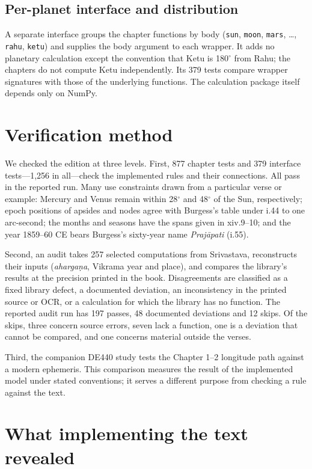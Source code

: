 \documentclass[11pt,a4paper]{article}
\begin{document}
\subsection{Per-planet interface and distribution}

A separate interface groups the chapter functions by body (\texttt{sun}, \texttt{moon}, \texttt{mars}, \ldots{}, \texttt{rahu}, \texttt{ketu}) and supplies the body argument to each wrapper. It adds no planetary calculation except the convention that Ketu is 180$^\circ$ from Rahu; the chapters do not compute Ketu independently. Its 379 tests compare wrapper signatures with those of the underlying functions. The calculation package itself depends only on NumPy.

\section{Verification method}
\label{sec:verification}

We checked the edition at three levels. First, 877 chapter tests and 379 interface tests---1,256 in all---check the implemented rules and their connections. All pass in the reported run. Many use constraints drawn from a particular verse or example: Mercury and Venus remain within 28$^\circ$ and 48$^\circ$ of the Sun, respectively; epoch positions of apsides and nodes agree with Burgess's table under i.44 to one arc-second; the months and seasons have the spans given in xiv.9--10; and the year 1859--60 CE bears Burgess's sixty-year name \textit{Praj\={a}pati} (i.55).

Second, an audit takes 257 selected computations from Srivastava, reconstructs their inputs (\textit{aharga\d{n}a}, Vikrama year and place), and compares the library's results at the precision printed in the book. Disagreements are classified as a fixed library defect, a documented deviation, an inconsistency in the printed source or OCR, or a calculation for which the library has no function. The reported audit run has 197 passes, 48 documented deviations and 12 skips. Of the skips, three concern source errors, seven lack a function, one is a deviation that cannot be compared, and one concerns material outside the verses.

Third, the companion DE440 study tests the Chapter 1--2 longitude path against a modern ephemeris. This comparison measures the result of the implemented model under stated conventions; it serves a different purpose from checking a rule against the text.

\section{What implementing the text revealed}
\label{sec:findings}
\end{document}
